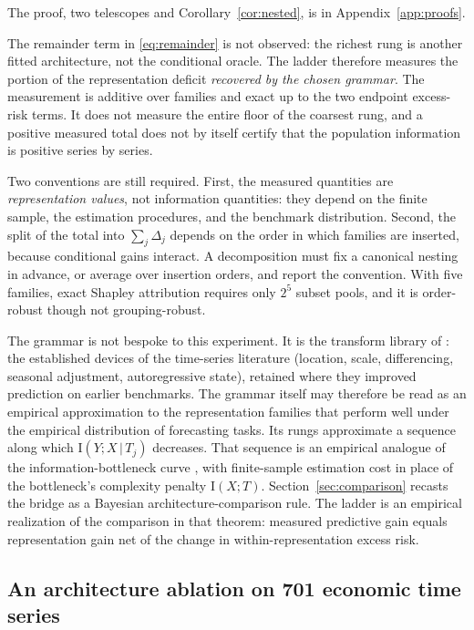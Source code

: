 \documentclass[11pt]{article}
\theoremstyle{remark}
\newcommand{\I}{\mathrm{I}}
\newcommand{\given}{\,|\,}
\begin{document}
The proof, two telescopes and Corollary~\ref{cor:nested}, is in Appendix~\ref{app:proofs}.

The remainder term in \eqref{eq:remainder} is not observed: the richest rung is another fitted
architecture, not the conditional oracle. The ladder therefore measures the portion of the
representation deficit \emph{recovered by the chosen grammar}. The measurement is additive
over families and exact up to the two endpoint excess-risk terms. It does not measure the entire floor of the
coarsest rung, and a positive measured total does not by itself certify that the population
information is positive series by series.

Two conventions are still required. First, the measured quantities are \emph{representation
values}, not information quantities: they depend on the finite sample, the estimation
procedures, and the benchmark distribution. Second, the split of the total into $\sum_j\Delta_j$ depends on the order in which families
are inserted, because conditional gains interact. A decomposition must fix a canonical
nesting in advance, or average over insertion orders, and report the convention. With five
families, exact Shapley attribution requires only $2^5$ subset pools, and it is order-robust
though not grouping-robust.

The grammar is not bespoke to this experiment. It is the transform library of
\citet{cotton_skaters}: the established devices of the time-series literature (location,
scale, differencing, seasonal adjustment, autoregressive state), retained where they improved
prediction on earlier benchmarks. The grammar itself may therefore be read as an empirical approximation to the representation families that perform well under
the empirical distribution of forecasting tasks. Its rungs approximate a sequence along which
$\I(Y;X\given T_j)$ decreases. That sequence is an empirical analogue of the
information-bottleneck curve \citep{tishby1999information}, with finite-sample estimation
cost in place of the bottleneck's complexity penalty $\I(X;T)$.
Section~\ref{sec:comparison} recasts the bridge as a Bayesian architecture-comparison rule.
The ladder is an empirical realization of the comparison in that theorem: measured predictive
gain equals representation gain net of the change in within-representation excess risk.

\subsection{An architecture ablation on 701 economic time series}\label{sec:ablation}
\end{document}
